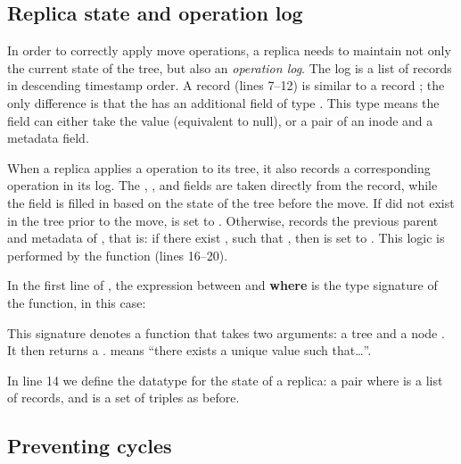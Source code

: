 \documentclass[sigconf]{acmart}
\begin{document}
\subsection{Replica state and operation log}\label{sec:state-log}

In order to correctly apply move operations, a replica needs to maintain not only the current state of the tree, but also an \emph{operation log}.
The log is a list of  records in descending timestamp order.
A  record (lines 7--12) is similar to a record ; the only difference is that the  has an additional field  of type .
This  type means the field can either take the value  (equivalent to null), or a pair of an inode and a metadata field.

When a replica applies a  operation to its tree, it also records a corresponding  operation in its log.
The , ,  and  fields are taken directly from the  record, while the  field is filled in based on the state of the tree before the move.
If  did not exist in the tree prior to the move,  is set to .
Otherwise,  records the previous parent and metadata of , that is: if there exist ,  such that , then  is set to .
This logic is performed by the  function (lines 16--20).

In the first line of , the expression between \isa{::} and \textbf{where} is the type signature of the function, in this case:
\begin{quote}
\end{quote}
This signature denotes a function that takes two arguments: a tree  and a node .
It then returns a .
 means ``there exists a unique value  such that\dots''.

In line 14 we define the datatype for the state of a replica: a pair  where  is a list of  records, and  is a set of  triples as before.

\subsection{Preventing cycles}\label{sec:prevent-cycles}
\end{document}

